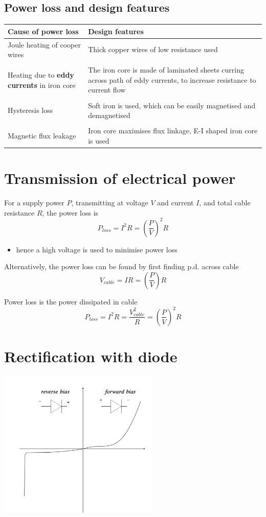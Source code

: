 \documentclass[a4paper, 10pt]{article}
\begin{document}
\subsection{Power loss and design features}
\begin{center}
   \begin{tabular}{T | T}
      Cause of power loss & Design features \\
      \hline
      Joule heating of cooper wires & Thick copper wires of low resistance used \\ \\
      Heating due to \textbf{eddy currents} in iron core & The iron core is made of laminated sheets curring across path of eddy currents, to increase resistance to current flow \\ \\
      Hysteresis loss & Soft iron is used, which can be easily magnetised and demagnetised \\ \\
      Magnetic flux leakage & Iron core maximises flux linkage, E-I shaped iron core is used 
   \end{tabular}
\end{center}

\section{Transmission of electrical power}

For a supply power $P$, transmitting at voltage $V$  and current $I$, and total cable resistance $R$, the power loss is
\[
   P_{loss} = I^2 R = \left( \frac{P}{V} \right)^2 R
\]
\begin{itemize}
   \item hence a high voltage is used to minimise power loss
\end{itemize}	

Alternatively, the power loss can be found by first finding p.d. across cable
\[
   V_{cable} = IR = \left( \frac{P}{V} \right)  R
\]

Power loss is the power dissipated in cable
\[
   P_{loss} = I^2 R = \frac{V_{cable}^2}{R} = \left( \frac{P}{V} \right)^2 R
\]

\section{Rectification with diode}
\begin{center}
   \includegraphics[width=3in]{figures/3.pdf} 
\end{center}	
\end{document}
